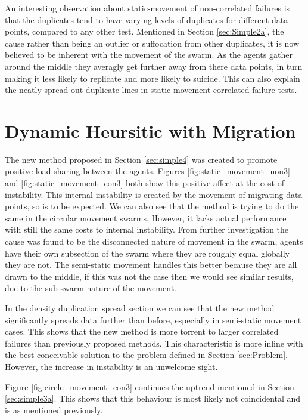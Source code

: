 \documentclass{UoYCSproject}
\begin{document}
An interesting observation about static-movement of non-correlated failures is that the duplicates tend to have varying levels of duplicates for different data points, compared to any other test. 
Mentioned in Section \ref{sec:Simple2a}, the cause rather than being an outlier or suffocation from other duplicates, it is now believed to be inherent with the movement of the swarm. 
As the agents gather around the middle they averagly get further away from there data points, in turn making it less likely to replicate and more likely to suicide. 
This can also explain the neatly spread out duplicate lines in static-movement correlated failure tests.

\section{Dynamic Heursitic with Migration}
\label{sec:Simple4a}

The new method proposed in Section \ref{sec:simple4} was created to promote positive load sharing between the agents. 
Figures \ref{fig:static_movement_non3} and \ref{fig:static_movement_con3} both show this positive affect at the cost of instability. 
This internal instability is created by the movement of migrating data points, so is to be expected. 
We can also see that the method is trying to do the same in the circular movement swarms. 
However, it lacks actual performance with still the same costs to internal instability. 
From further investigation the cause was found to be the disconnected nature of movement in the swarm, agents have their own subsection of the swarm where they are roughly equal globally they are not. 
The semi-static movement handles this better because they are all drawn to the middle, if this was not the case then we would see similar results, due to the sub swarm nature of the movement.

In the density duplication spread section we can see that the new method significantly spreads data further than before, especially in semi-static movement cases. 
This shows that the new method is more torrent to larger correlated failures than previously proposed methods. 
This characteristic is more inline with the best conceivable solution to the problem defined in Section \ref{sec:Problem}. 
However, the increase in instability is an unwelcome sight.

Figure \ref{fig:circle_movement_con3} continues the uptrend mentioned in Section \ref{sec:simple3a}. 
This shows that this behaviour is most likely not coincidental and is as mentioned previously.
\end{document}
